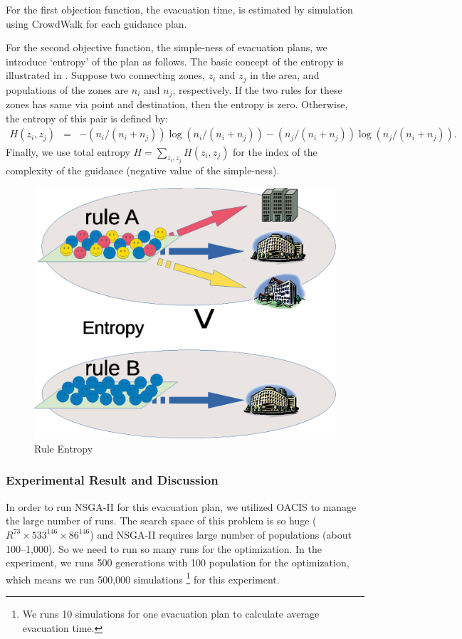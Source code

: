 For the first objection function, the evacuation time,
is estimated by simulation using CrowdWalk for each guidance plan.

For the second objective function, the simple-ness of evacuation plans,
we introduce `entropy' of the plan as follows.
The basic concept of the entropy
is illustrated in .
Suppose two connecting zones, $z_i$ and $z_j$ in the area, and
populations of the zones are $n_i$ and $n_j$, respectively.
If the two rules for these zones has same via point and destination,
then the entropy is zero.
Otherwise, 
the entropy of this pair is defined by:
\begin{eqnarray}
  H(z_i,z_j) & = & - (n_i/(n_i + n_j))\log(n_i/(n_i + n_j))
                  - (n_j/(n_i + n_j))\log(n_j/(n_i + n_j))
                  .
                  \nonumber
\end{eqnarray}
Finally, we use total entropy $H = \sum_{z_i,z_j} H(z_i, z_j)$
for the index of the complexity of the guidance (negative value
of the simple-ness).


\begin{figure}
  \centering
  \includegraphics[width=.5\linewidth]{Figs.noda/figure-09.evac_rule.eps}
  \caption{Rule Entropy}
  \label{fig:Figs.noda/figure-09.evac_rule.eps}
\end{figure}

\subsubsection{Experimental Result and Discussion}
\label{sss:nsga-experiment}

In order to run NSGA-II for this evacuation plan,
we utilized OACIS\cite{murase:2014} to manage the large number of runs.
The search space of this problem is so huge
($R^{73} \times 533^{146} \times 86^{146}$)
and NSGA-II requires large number of populations (about 100--1,000).
So we need to run so many runs for the optimization.
In the experiment, we runs 500 generations with 100 population
for the optimization,
which means we run 500,000 simulations
\footnote{We runs 10 simulations for one evacuation plan
  to calculate average evacuation time.}
for this experiment.

